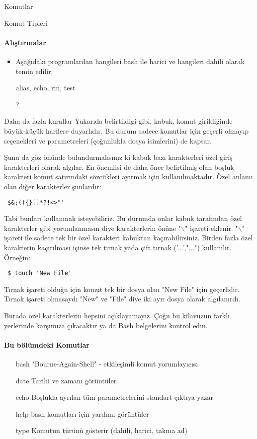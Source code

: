 \begin{section}{Komutlar}
\begin{subsection}{Komut Tipleri}
\paragraph{Alıştırmalar}{
\begin{itemize}
\item Aşağıdaki programlardan hangileri bash ile harici ve hangileri dahili olarak temin edilir: \begin{em}alias, echo, rm, test\end{em}?
\end{itemize}
}
\end{subsection}
\begin{subsection}{Daha da fazla kurallar}
Yukarıda belirtildigi gibi, kabuk, komut girildiğinde büyük-küçük harflere duyarlıdır. Bu durum sadece komutlar için geçerli olmayıp seçenekleri ve parametreleri (çoğunlukla dosya isimlerini) de kapsar.

Şunu da göz önünde bulundurmalısınız ki kabuk bazı karakterleri özel giriş karakterleri olarak algılar. En önemlisi de daha önce belirtilmiş olan
boşluk karakteri komut satırındaki sözcükleri ayırmak için kullanılmaktadır. Özel anlamı olan diğer karakterler şunlardır:

\begin{verbatim}
 $&;(){}[]*?!<>"'
\end{verbatim}

Tabi bunları kullanmak isteyebiliriz. Bu durumda onlar kabuk tarafından özel karakterler gibi yorumlanmasın diye karakterlerin önüne "$\backslash$" işareti eklenir. "$\backslash$" işareti ile sadece tek bir özel karakteri kabuktan kaçırabilirsiniz. Birden fazla özel karakterin kaçırılması içinse tek tırnak yada çift tırnak ('...',"...") kullanılır. Örneğin:

\begin{verbatim}
 $ touch 'New File'
\end{verbatim}

Tırnak işareti olduğu için komut tek bir dosya olan "New File" için geçerlidir. Tırnak işareti olmasaydı "New" ve "File" diye iki ayrı dosya olarak algılanırdı.

Burada özel karakterlerin hepsini açıklayamayız. Çoğu bu kilavuzun farklı yerlerinde karşımıza çıkacaktır ya da Bash belgelerini kontrol edin.

\paragraph{Bu bölümdeki Komutlar}{
\begin{itemize}
\item[bash] 	"Bourne-Again-Shell" - etkileşimli komut yorumlayıcısı
\item[date] 	Tarihi ve zamanı görüntüler
\item[echo] 	Boşlukla ayrılan tüm parametrelerini standart çıktıya yazar
\item[help]	bash komutları için yardımı görüntüler
\item[type] 	Komutun türünü gösterir (dahili, harici, takma ad)
\end{itemize}}

\end{subsection}
\end{section}
